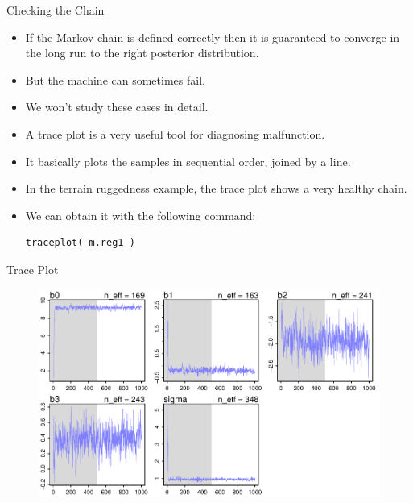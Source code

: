 \documentclass[handout]{beamer}
\begin{document}
\begin{frame}[fragile]{Checking the Chain }
\scriptsize{


\begin{itemize}


\item If the Markov chain is defined correctly then it is guaranteed to converge in the long run to the right posterior distribution. 
\item But the machine can sometimes fail.

\item We won't study these cases in detail.

\item A trace plot is a very useful tool for diagnosing malfunction.

\item It basically plots the samples in sequential order, joined by a line.

\item In the terrain ruggedness example, the trace plot shows a very healthy chain.

\item We can obtain it with the following command:

\begin{verbatim}
traceplot( m.reg1 ) 
\end{verbatim}


 \end{itemize}




} 
\end{frame}


\begin{frame}{Trace Plot}



 \begin{figure}[h!]
	\centering
	\includegraphics[scale=0.7]{pics/traceplot.pdf}
	\end{figure} 



\end{frame}
\end{document}
